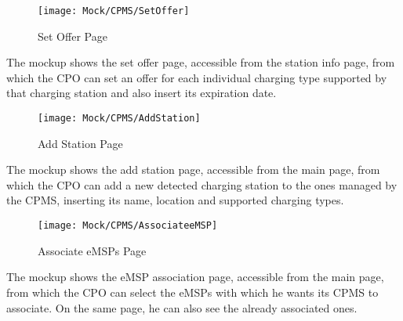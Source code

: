 \newpage
\begin{preface}
\begin{figure}[H]
    \begin{center}
    \texttt{[image: Mock/CPMS/SetOffer]}
    \caption{Set Offer Page}
    \label{fig:SetOffer}
    \end{center}
\end{figure}
The mockup shows the set offer page, accessible from the station info page, from which the CPO can set an offer for each individual charging type supported by that charging station and also insert its expiration date.
\end{preface}
\newpage
\begin{preface}
\begin{figure}[H]
    \begin{center}
    \texttt{[image: Mock/CPMS/AddStation]}
    \caption{Add Station Page}
    \label{fig:AddStation}
    \end{center}
\end{figure}
The mockup shows the add station page, accessible from the main page, from which the CPO can add a new detected charging station to the ones managed by the CPMS, inserting its name, location and supported charging types.
\end{preface}
\newpage
\begin{preface}
\begin{figure}[H]
    \begin{center}
    \texttt{[image: Mock/CPMS/AssociateeMSP]}
    \caption{Associate eMSPs Page}
    \label{fig:AssociateeMSP}
    \end{center}
\end{figure}
The mockup shows the eMSP association page, accessible from the main page, from which the CPO can select the eMSPs with which he wants its CPMS to associate. On the same page, he can also see the already associated ones.
\end{preface}

\restoregeometry
